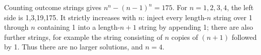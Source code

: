 Counting outcome strings gives $ n^n-(n-1)^n=175 $. For $ n=1,2,3,4 $, the left side is 1,3,19,175. It strictly increases with $ n $: inject every length-$ n $ string over 1 through $ n $ containing 1 into a length-$ n+1 $ string by appending 1; there are also further strings, for example the string consisting of $n$ copies of $(n+1)$ followed by 1. Thus there are no larger solutions, and $\boxed{n=4}$.

